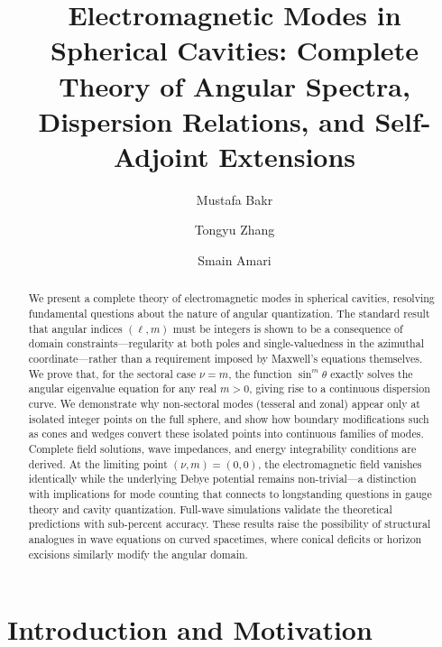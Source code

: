 \documentclass[
  aip,
  amsmath,amssymb,
  preprint
]{revtex4-1}
\begin{document}
\raggedbottom

\title{Electromagnetic Modes in Spherical Cavities: Complete Theory of Angular Spectra, Dispersion Relations, and Self-Adjoint Extensions}

\author{Mustafa Bakr}
\author{Tongyu Zhang}
\author{Smain Amari}



\begin{abstract}
We present a complete theory of electromagnetic modes in spherical cavities, resolving fundamental questions about the nature of angular quantization. The standard result that angular indices $(\ell,m)$ must be integers is shown to be a consequence of domain constraints---regularity at both poles and single-valuedness in the azimuthal coordinate---rather than a requirement imposed by Maxwell's equations themselves. We prove that, for the sectoral case $\nu=m$, the function $\sin^{m}\theta$ exactly solves the angular eigenvalue equation for any real $m>0$, giving rise to a continuous dispersion curve. We demonstrate why non-sectoral modes (tesseral and zonal) appear only at isolated integer points on the full sphere, and show how boundary modifications such as cones and wedges convert these isolated points into continuous families of modes. Complete field solutions, wave impedances, and energy integrability conditions are derived. At the limiting point $(\nu, m) = (0, 0)$, the electromagnetic field vanishes identically while the underlying Debye potential remains non-trivial---a distinction with implications for mode counting that connects to longstanding questions in gauge theory and cavity quantization. Full-wave simulations validate the theoretical predictions with sub-percent accuracy. These results raise the possibility of structural analogues in wave equations on curved spacetimes, where conical deficits or horizon excisions similarly modify the angular domain.
\end{abstract}


\maketitle


\section{Introduction and Motivation}
\end{document}
